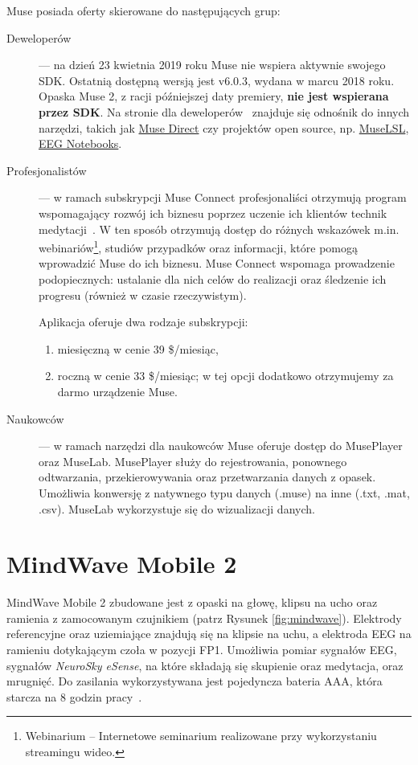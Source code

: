 \documentclass[skorowidz,skroty]{dyplomWEZUT}
\begin{document}
Muse posiada oferty skierowane do następujących grup:
\begin{description}
    \item [Deweloperów] --- na dzień 23 kwietnia 2019 roku Muse nie wspiera aktywnie swojego SDK. Ostatnią dostępną wersją jest v6.0.3, wydana w marcu 2018 roku. Opaska Muse 2, z racji późniejszej daty premiery, \textbf{nie jest wspierana przez SDK}. Na stronie dla deweloperów~\cite{muse_developer} znajduje się odnośnik do innych narzędzi, takich jak \href{https://choosemuse.com/muse-direct/}{Muse Direct} czy projektów open source, np. \href{https://github.com/alexandrebarachant/muse-lsl}{MuseLSL}, \href{https://github.com/NeuroTechX/eeg-notebooks}{EEG Notebooks}.

    \item [Profesjonalistów] --- w ramach subskrypcji Muse Connect profesjonaliści otrzymują program wspomagający rozwój ich biznesu poprzez uczenie ich klientów technik medytacji~\cite{muse_professional}. W ten sposób otrzymują dostęp do różnych wskazówek m.in. webinariów\footnote{Webinarium -- Internetowe seminarium realizowane przy wykorzystaniu streamingu wideo.}, studiów przypadków oraz informacji, które pomogą wprowadzić Muse do ich biznesu. Muse Connect wspomaga prowadzenie podopiecznych: ustalanie dla nich celów do realizacji oraz śledzenie ich progresu (również w czasie rzeczywistym).

    Aplikacja oferuje dwa rodzaje subskrypcji:
    \begin{enumerate}
        \item miesięczną w cenie 39 \$/miesiąc,
        \item roczną w cenie 33 \$/miesiąc; w tej opcji dodatkowo otrzymujemy za darmo urządzenie Muse.
    \end{enumerate}

    \item [Naukowców] --- w ramach narzędzi dla naukowców Muse oferuje dostęp do MusePlayer oraz MuseLab. MusePlayer służy do rejestrowania, ponownego odtwarzania, przekierowywania oraz przetwarzania danych z opasek. Umożliwia konwersję z natywnego typu danych (.muse) na inne (.txt, .mat, .csv). MuseLab wykorzystuje się do wizualizacji danych.
\end{description}


\section{MindWave Mobile 2}
MindWave Mobile 2 zbudowane jest z opaski na głowę, klipsu na ucho oraz ramienia z zamocowanym czujnikiem (patrz Rysunek \vref{fig:mindwave}). Elektrody referencyjne oraz uziemiające znajdują się na klipsie na uchu, a elektroda EEG na ramieniu dotykającym czoła w pozycji FP1. Umożliwia pomiar sygnałów EEG, sygnałów \textit{NeuroSky eSense}, na które składają się skupienie oraz medytacja, oraz mrugnięć. Do zasilania wykorzystywana jest pojedyncza bateria AAA, która starcza na 8 godzin pracy~\cite{mindwave}.
\end{document}
